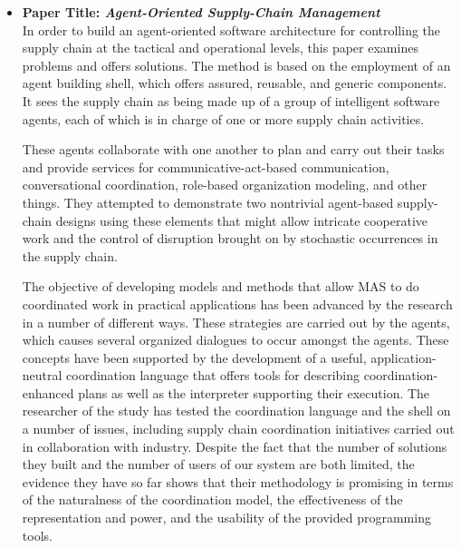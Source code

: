 \begin{itemize}[label={}]
\vspace{.5cm}

\item \textbf{Paper Title: \textit{Agent-Oriented Supply-Chain Management}} \\

In order to build an agent-oriented software architecture for controlling the supply chain at the tactical and operational levels, this paper \cite{agSupch} examines problems and offers solutions. The method is based on the employment of an agent building shell, which offers assured, reusable, and generic components. It sees the supply chain as being made up of a group of intelligent software agents, each of which is in charge of one or more supply chain activities. 

\vspace{.5cm}

These agents collaborate with one another to plan and carry out their tasks and provide services for communicative-act-based communication, conversational coordination, role-based organization modeling, and other things. They attempted to demonstrate two nontrivial agent-based supply-chain designs using these elements that might allow intricate cooperative work and the control of disruption brought on by stochastic occurrences in the supply chain.

\vspace{.5cm}

The objective of developing models and methods that allow \ac{MAS} to do coordinated work in practical applications has been advanced by the research in a number of different ways. These strategies are carried out by the agents, which causes several organized dialogues to occur amongst the agents. These concepts have been supported by the development of a useful, application-neutral coordination language that offers tools for describing coordination-enhanced plans as well as the interpreter supporting their execution. The researcher of the study has tested the coordination language and the shell on a number of issues, including supply chain coordination initiatives carried out in collaboration with industry. Despite the fact that the number of solutions they built and the number of users of our system are both limited, the evidence they have so far shows that their methodology is promising in terms of the naturalness of the coordination model, the effectiveness of the representation and power, and the usability of the provided programming tools.
\end{itemize}

